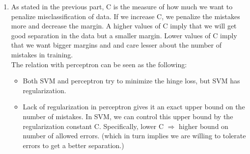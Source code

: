 \documentclass[letterpaper]{article}
\begin{document}
\begin{enumerate}
		\item As stated in the previous part, C is the measure of how much we want to penalize misclassification of data. If we increase C, we penalize the mistakes more and decrease the margin. A higher values of C imply that we will get good separation in the data but a smaller margin. Lower values of C imply that we want bigger margins and and care lesser about the number of mistakes in training.\\
		The relation with perceptron can be seen as the following:
		\begin{itemize}
			\item Both SVM and perceptron try to minimize the hinge loss, but SVM has regularization.
			\item Lack of regularization in perceptron gives it an exact upper bound on the number of mistakes. In SVM, we can control this upper bound by the regularization constant C. Specifically, lower C $\Rightarrow$ higher bound on number of allowed errors. (which in turn implies we are willing to tolerate errors to get a better separation.)
		\end{itemize}
		
	\end{enumerate}
	
\end{document}
